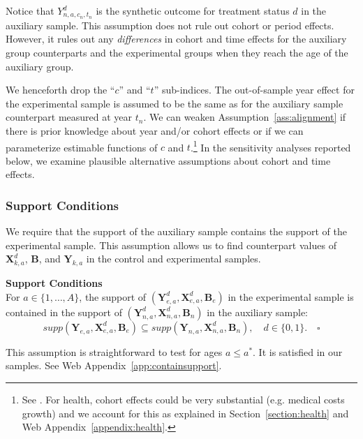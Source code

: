 Notice that $Y^d_{n,a,{c_n},{t_n}}$ is the synthetic outcome for treatment status $d$ in the auxiliary sample. This assumption does not rule out cohort or period effects. However, it rules out any \emph{differences} in cohort and time effects for the auxiliary group counterparts and the experimental groups when they reach the age of the auxiliary group.

We henceforth drop the ``$c$'' and ``$t$'' sub-indices. The out-of-sample year effect for the experimental sample is assumed to be the same as for the auxiliary sample counterpart measured at year $t_n$. We can weaken Assumption~\ref{ass:alignment} if there is prior knowledge about year and/or cohort effects or if we can parameterize estimable functions of $c$ and $t$.\footnote{See \cite{Heckman_Robb_1985_JE}. For health, cohort effects could be very substantial (e.g. medical costs growth) and we account for this as explained in Section~\ref{section:health} and Web Appendix~\ref{appendix:health}.} In the sensitivity analyses reported below, we examine plausible alternative assumptions about cohort and time effects.

\subsubsection{Support Conditions}

We require that the support of the auxiliary sample contains the support of the experimental sample. This assumption allows us to find counterpart values of $\bm{X}^d_{k,a}$, $\bm{B}$, and $\bm{Y}_{k,a}$ in the control and experimental samples.

\onehalfspacing
\begin{assumption} \label{ass:contain} \textbf{Support Conditions} \\
For $a \in \{ 1, \ldots, A \}$, the support of $\left( \bm{Y}^d_{e,a}, \bm{X}^d_{e,a}, \bm{B}_e \right)$ in the experimental sample is contained in the support of $\left( \bm{Y}^d_{n,a}, \bm{X}^d_{n,a}, \bm{B}_n \right)$ in the auxiliary sample:
\begin{equation}
supp( \bm{Y}_{e,a}, \bm{X}^d_{e,a}, \bm{B}_e ) \subseteq supp( \bm{Y}_{n,a}, \bm{X}^d_{n,a}, \bm{B}_n ), \quad d \in \{0,1\}. \quad \square
\end{equation}
\end{assumption}
\doublespacing
This assumption is straightforward to test for ages $a\leq a^\ast$. It is satisfied in our samples. See Web Appendix~\ref{app:containsupport}.


